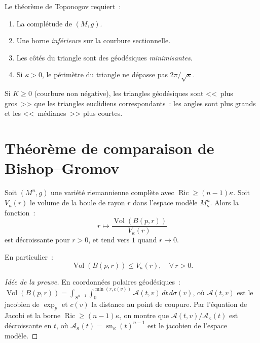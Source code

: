 \begin{attention}[title=\textbf{Conditions d'application de Toponogov}]
Le th\'eor\`eme de Toponogov requiert~:
\begin{enumerate}
    \item La compl\'etude de $(M, g)$.
    \item Une borne \emph{inf\'erieure} sur la courbure sectionnelle.
    \item Les c\^ot\'es du triangle sont des g\'eod\'esiques \emph{minimisantes}.
    \item Si $\kappa > 0$, le p\'erim\`etre du triangle ne d\'epasse pas $2\pi/\sqrt{\kappa}$.
\end{enumerate}
\end{attention}

\begin{corollaire}
Si $K \geq 0$ (courbure non n\'egative), les triangles g\'eod\'esiques sont
<<~plus gros~>> que les triangles euclidiens correspondants~: les angles sont plus
grands et les <<~m\'edianes~>> plus courtes.
\end{corollaire}

\section{Th\'eor\`eme de comparaison de Bishop--Gromov}

\begin{theoreme}
\label{thm:bishop_gromov}
Soit $(M^n, g)$ une vari\'et\'e riemannienne compl\`ete avec
$\operatorname{Ric} \geq (n-1)\kappa$. Soit $V_\kappa(r)$ le volume de la boule
de rayon $r$ dans l'espace mod\`ele $M^n_\kappa$. Alors la fonction~:
\[
    r \mapsto \frac{\operatorname{Vol}(B(p, r))}{V_\kappa(r)}
\]
est d\'ecroissante pour $r > 0$, et tend vers $1$ quand $r \to 0$.

En particulier~:
\[
    \operatorname{Vol}(B(p, r)) \leq V_\kappa(r), \quad \forall\, r > 0.
\]
\end{theoreme}

\begin{proof}[Id\'ee de la preuve]
En coordonn\'ees polaires g\'eod\'esiques~:
$\operatorname{Vol}(B(p,r)) = \int_{S^{n-1}} \int_0^{\min(r, c(v))}
\mathcal{A}(t, v)\, dt\, d\sigma(v)$,
o\`u $\mathcal{A}(t, v)$ est le jacobien de $\exp_p$ et $c(v)$ la distance au point
de coupure. Par l'\'equation de Jacobi et la borne $\operatorname{Ric} \geq (n-1)\kappa$,
on montre que $\mathcal{A}(t,v)/\mathcal{A}_\kappa(t)$ est d\'ecroissante en $t$,
o\`u $\mathcal{A}_\kappa(t) = \operatorname{sn}_\kappa(t)^{n-1}$ est le jacobien
de l'espace mod\`ele.
\end{proof}


